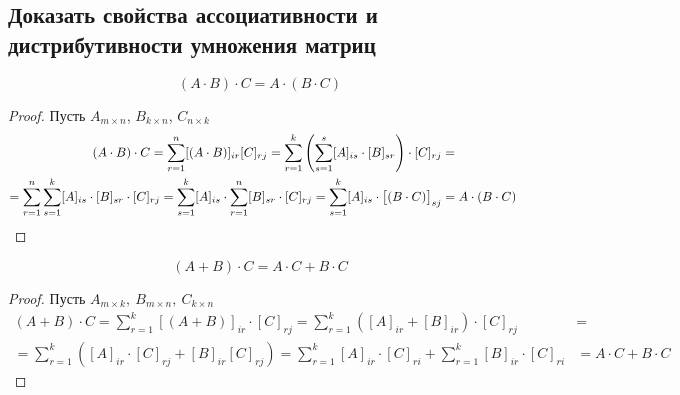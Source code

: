 \subsection{Доказать свойства ассоциативности и дистрибутивности умножения матриц}
\begin{mdframed}[style=Teal, frametitle={Ассоциативность умножения матриц:}]
	\[ (A \cdot B) \cdot C = A\cdot (B\cdot C) \]
\end{mdframed}
\begin{proof}
	Пусть $A_{m \times n}$, $B_{k \times n}$, $C_{n \times k}$
	\begin{align*}
		(A\cdot B)\cdot C = \sum^n_{r = 1}[(A\cdot B)]_{ir} [C]_{rj} = \sum^k_{r=1} \left(\sum^s_{s=1} [A]_{is} \cdot [B]_{sr}\right) \cdot [C]_{rj} &= \\
		= \sum^n_{r=1} \sum^k_{s=1} [A]_{is} \cdot [B]_{sr} \cdot [C]_{rj} = \sum^k_{s = 1} [A]_{is} \cdot \sum^n_{r=1} [B]_{sr} \cdot [C]_{rj} = \sum^k_{s=1} [A]_{is} \cdot \big[(B\cdot C)\big]_{sj} &= A\cdot (B\cdot C) \hspace{-5pt}
	\end{align*}
\end{proof}
\begin{mdframed}[style=Teal, frametitle={Дистрибутивность умножения матриц относительно сложения:}]
	\[ (A+B)\cdot C = A\cdot C + B\cdot C \]
\end{mdframed}
\begin{proof}
	Пусть $A_{m \times k},\ B_{m \times n},\ C_{k \times n}$
	\begin{align*}
		(A+B)\cdot C = \sum^k_{r=1} [(A+B)]_{ir} \cdot [C]_{rj} = \sum^k_{r=1} ([A]_{ir} + [B]_{ir}) \cdot [C]_{rj} &= \\
		=\sum^k_{r=1} ([A]_{ir} \cdot [C]_{rj} + [B]_{ir}[C]_{rj}) = \sum^k_{r=1}[A]_{ir} \cdot [C]_{ri} + \sum^k_{r=1} [B]_{ir}\cdot [C]_{ri} &= A\cdot C + B\cdot C
	\end{align*}
\end{proof}

\newpage
